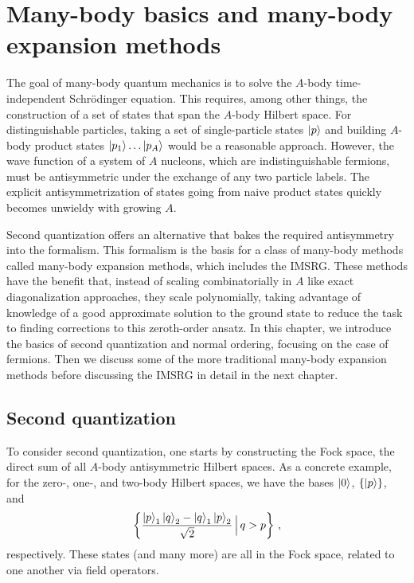 \chapter[Many-body basics and many-body expansion methods][Many-body basics and many-body expansion \\ methods]{Many-body basics and many-body expansion methods}\label{ch:many_body}

The goal of many-body quantum mechanics is to solve
the $A$-body time-independent Schr\"{o}dinger equation.
This requires, among other things, the construction of a set of states that span
the $A$-body Hilbert space.
For distinguishable particles, taking a set of single-particle states $\ket{p}$
and building $A$-body product states $\ket{p_1}\ldots\ket{p_A}$ would be a reasonable approach.
However, the wave function of a system of $A$ nucleons,
which are indistinguishable fermions,
must be antisymmetric under the exchange of any two particle labels.
The explicit antisymmetrization of states going from naive product states
quickly becomes unwieldy with growing $A$.

Second quantization offers an alternative that bakes the required antisymmetry
into the formalism.
This formalism is the basis for a class of many-body methods
called many-body expansion methods, which includes the IMSRG.\@
These methods have the benefit that,
instead of scaling combinatorially in $A$ like exact diagonalization approaches,
they scale polynomially,
taking advantage of knowledge of a good approximate solution to the ground state
to reduce the task to finding corrections to this zeroth-order ansatz.
In this chapter, we introduce the basics of second quantization and normal ordering,
focusing on the case of fermions.
Then we discuss some of the more traditional many-body expansion methods
before discussing the IMSRG in detail in the next chapter.

\section{Second quantization}\label{sec:second_quantization}

To consider second quantization, one starts by constructing the Fock space,
the direct sum of all $A$-body antisymmetric Hilbert spaces.
As a concrete example, for the zero-, one-, and two-body Hilbert spaces, we have the bases
$\ket{0}$, $\{\ket{p}\}$, and
\begin{equation*}
  \left\{\frac{\ket{p}_{1}\ket{q}_{2} - \ket{q}_{1}\ket{p}_2}{\sqrt{2}} \, \Big| \, q > p \right\}\,,
\end{equation*}
respectively.
These states (and many more) are all in the Fock space,
related to one another via field operators.

